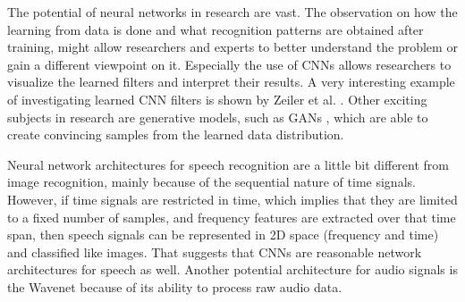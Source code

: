 The potential of neural networks in research are vast.
The observation on how the learning from data is done and what recognition patterns are obtained after training, might allow researchers and experts to better understand the problem or gain a different viewpoint on it.
Especially the use of CNNs allows researchers to visualize the learned filters and interpret their results.
A very interesting example of investigating learned CNN filters is shown by Zeiler et al. \cite{Zeiler2013}.
Other exciting subjects in research are generative models, such as GANs \cite{Goodfellow2014}, which are able to create convincing samples from the learned data distribution.

Neural network architectures for speech recognition are a little bit different from image recognition, mainly because of the sequential nature of time signals.
However, if time signals are restricted in time, which implies that they are limited to a fixed number of samples, and frequency features are extracted over that time span, then speech signals can be represented in 2D space (frequency and time) and classified like images.
That suggests that CNNs are reasonable network architectures for speech as well.
Another potential architecture for audio signals is the Wavenet \cite{Oord2016} because of its ability to process raw audio data.